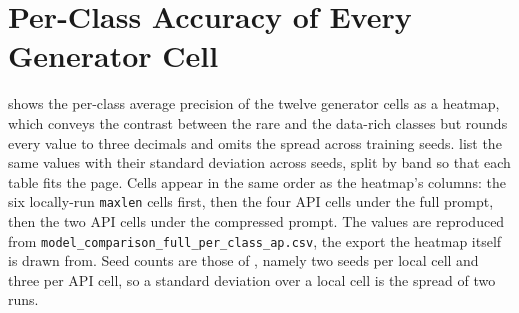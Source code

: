 \renewcommand{\figurename}{Figure}

\section{Per-Class Accuracy of Every Generator Cell}\label{sec:appendix_per_class_ap}

 shows the per-class average precision of the twelve generator cells as a heatmap, which conveys the contrast between the rare and the data-rich classes but rounds every value to three decimals and omits the spread across training seeds.  list the same values with their standard deviation across seeds, split by band so that each table fits the page. Cells appear in the same order as the heatmap's columns: the six locally-run \texttt{maxlen} cells first, then the four API cells under the full prompt, then the two API cells under the compressed prompt. The values are reproduced from \texttt{model\_comparison\_full\_per\_class\_ap.csv}, the export the heatmap itself is drawn from. Seed counts are those of , namely two seeds per local cell and three per API cell, so a standard deviation over a local cell is the spread of two runs.

